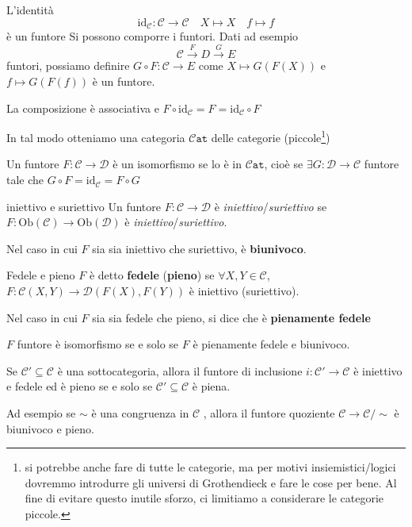     L'identità
    \[
      \mathrm{id}_\mathcal{C} : \mathcal{C} \to \mathcal{C} \quad X \mapsto X \quad f \mapsto f
    \]
    è un funtore
    Si possono comporre i funtori. Dati ad esempio 
    \[
      \mathcal{C} \overset{F}{\to } D \overset{G}{\to } E
    \]
    funtori, possiamo definire \(G \circ F : \mathcal{C} \to E\) come \(X \mapsto G{(F{(X)})}\)  e \(f \mapsto G{(F{(f)})}\) è un funtore.

    La composizione è associativa  e \(F \circ \mathrm{id}_\mathcal{C} = F = \mathrm{id}_\mathcal{C} \circ F\) 

In tal modo otteniamo una categoria \(\mathtt{\mathcal{C}at}\) delle categorie (piccole\footnote{si potrebbe anche fare di tutte le categorie, ma per motivi
insiemistici/logici dovremmo introdurre gli universi di Grothendieck e fare le
cose per bene. Al fine di evitare questo inutile sforzo, ci limitiamo a
considerare le categorie piccole.})

\begin{definition}{}
    Un funtore \(F : \mathcal{C} \to \mathcal{D}\) è un isomorfismo se lo è in \(\mathtt{\mathcal{C}at}\),
    cioè se \(\exists G : \mathcal{D} \to \mathcal{C}\)  funtore tale che \(G \circ F = \mathrm{id}_\mathcal{C} = F \circ G\) 
\end{definition}

\begin{definition}{iniettivo e suriettivo}
    Un funtore \(F : \mathcal{C} \to \mathcal{D}\) è
    \emph{iniettivo}/\emph{suriettivo} se \(F : \mathrm{Ob}{(\mathcal{C})} \to
    \mathrm{Ob}{(\mathcal{D})}\) è \emph{iniettivo}/\emph{suriettivo}.

    Nel caso in cui \(F\) sia sia iniettivo che suriettivo, è \textbf{biunivoco}.
\end{definition}

\begin{definition}{Fedele e pieno}
    \(F\) è detto \textbf{fedele} (\textbf{pieno}) se \(\forall X, Y \in
    \mathcal{C}\), \(F : \mathcal{C}{(X, Y)} \to \mathcal{D}{(F{(X)}, F{(Y)})}\) è
    iniettivo (suriettivo).

    Nel caso in cui \(F\) sia sia fedele che pieno, si dice che è
    \textbf{pienamente fedele}
\end{definition}
\begin{eser}{}
    \(F\) funtore è isomorfismo se e solo se \(F\) è pienamente fedele e
    biunivoco.
\end{eser}


\begin{example}{}
    Se \(\mathcal{C}' \subseteq \mathcal{C} \) è una sottocategoria, allora il funtore di inclusione
    \(i : \mathcal{C}' \to \mathcal{C}\) è iniettivo e fedele ed è pieno se e solo se \(\mathcal{C}' \subseteq \mathcal{C}\) è piena.

    Ad esempio se \(\sim \) è una congruenza in \(\mathcal{C}\) , allora il funtore
    quoziente \(\mathcal{C} \to \mathcal{C} / \sim \) è biunivoco e pieno.
\end{example}

